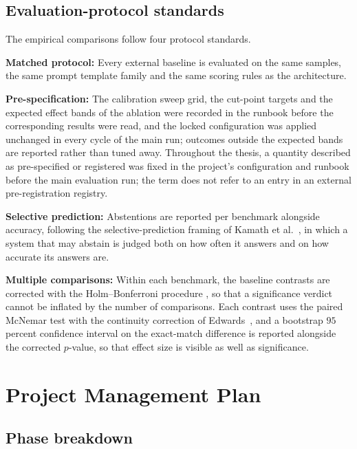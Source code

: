 \subsection{Evaluation-protocol standards}
\label{sec:std-evaluation}

The empirical comparisons follow four protocol standards.

\textbf{Matched protocol:} Every external baseline is evaluated on the same samples, the same prompt template family and the same scoring rules as the architecture.

\textbf{Pre-specification:} The calibration sweep grid, the cut-point targets and the expected effect bands of the ablation were recorded in the runbook before the corresponding results were read, and the locked configuration was applied unchanged in every cycle of the main run; outcomes outside the expected bands are reported rather than tuned away. Throughout the thesis, a quantity described as pre-specified or registered was fixed in the project's configuration and runbook before the main evaluation run; the term does not refer to an entry in an external pre-registration registry.

\textbf{Selective prediction:} Abstentions are reported per benchmark alongside accuracy, following the selective-prediction framing of Kamath et al.~\cite{kamath2020selective}, in which a system that may abstain is judged both on how often it answers and on how accurate its answers are.

\textbf{Multiple comparisons:} Within each benchmark, the baseline contrasts are corrected with the Holm--Bonferroni procedure \cite{holm1979simple}, so that a significance verdict cannot be inflated by the number of comparisons. Each contrast uses the paired McNemar test with the continuity correction of Edwards~\cite{edwards1948note}, and a bootstrap $95$ percent confidence interval on the exact-match difference is reported alongside the corrected $p$-value, so that effect size is visible as well as significance.

\section{Project Management Plan}
\label{sec:project-management}

\subsection{Phase breakdown}
\label{sec:pm-phases}

